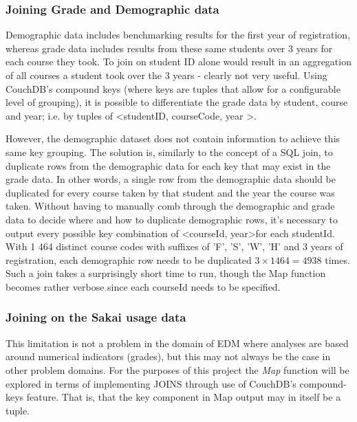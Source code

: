 \subsubsection*{Joining Grade and Demographic data}
Demographic data includes benchmarking results for the first year of registration, whereas grade data includes results from these same students over 3 years for each course they took. To join on student ID alone would result in an aggregation of all courses a student took over the 3 years - clearly not very useful. Using CouchDB's compound keys (where keys are tuples that allow for a configurable level of grouping), it is possible to differentiate the grade data by student, course and year; i.e. by tuples of \textless studentID, courseCode, year \textgreater.

However, the demographic dataset does not contain information to achieve this same key grouping. The solution is, similarly to the concept of a SQL join, to duplicate rows from the demographic data for each key that may exist in the grade data. In other words, a single row from the demographic data should be duplicated for every course taken by that student and the year the course was taken. Without having to manually comb through the demographic and grade data to decide where and how to duplicate demographic rows, it's necessary to output every possible key combination of \textless courseId, year\textgreater for each studentId. With 1 464 distinct course codes with suffixes of 'F', 'S', 'W', 'H' and 3 years of registration, each demographic row needs to be duplicated $ 3 \times 1464 = 4938 $ times. Such a join takes a surprisingly short time to run, though the Map function becomes rather verbose since each courseId needs to be specified.




\subsubsection*{Joining on the Sakai usage data}


This limitation is not a problem in the domain of EDM where analyses are based around numerical indicators (grades), but this may not always be the case in other problem domains. For the purposes of this project the \textit{Map} function will be explored in terms of implementing JOINS through use of CouchDB's compound-keys feature. That is, that the key component in Map output may in itself be a tuple.

